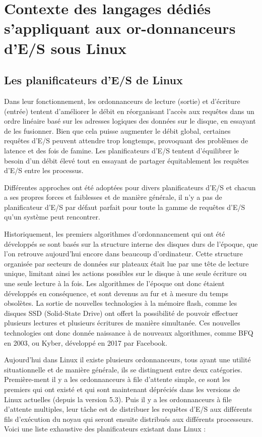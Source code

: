 \section[Contexte des langages dédiés s'appliquant aux ordonnanceurs d'E/S sous Linux]{Contexte des langages dédiés s'appliquant aux or-donnanceurs d'E/S sous Linux}
\label{context}

\subsection{Les planificateurs d'E/S de Linux}

Dans leur fonctionnement, les ordonnanceurs de lecture (sortie) et d'écriture 
(entrée) tentent d'améliorer le débit en réorganisant l'accès aux requêtes dans 
un ordre linéaire basé sur les adresses logiques des données sur le disque, en 
essayant de les fusionner. Bien que cela puisse augmenter le débit global, 
certaines requêtes d'E/S peuvent attendre trop longtemps, provoquant des 
problèmes de latence et des fois de famine. Les planificateurs d'E/S tentent 
d'équilibrer le besoin d'un débit élevé tout en essayant de partager 
équitablement les requêtes d'E/S entre les processus.

Différentes approches ont été adoptées pour divers planificateurs d'E/S et 
chacun a ses propres forces et faiblesses et de manière générale, il n'y a pas 
de planificateur d'E/S par défaut parfait pour toute la gamme de requêtes d'E/S 
qu'un système peut rencontrer. 

Historiquement, les premiers algorithmes d'ordonnancement qui ont été 
développés se sont basés sur la structure interne des disques durs de l'époque, 
que l'on retrouve aujourd'hui encore dans beaucoup d'ordinateur. Cette 
structure organisée par secteurs de données sur plateaux était lue par une tête 
de lecture unique, limitant ainsi les actions possibles sur le disque à une 
seule écriture ou une seule lecture à la fois. Les algorithmes de l'époque ont 
donc étaient développés en conséquence, et sont devenus au fur et à mesure du 
temps obsolètes. La sortie de nouvelles technologies à la mémoire flash, comme 
les disques SSD (Solid-State Drive) ont offert la possibilité de pouvoir 
effectuer plusieurs lectures et plusieurs écritures de manière simultanée. Ces 
nouvelles technologies ont donc donnée naissance à de nouveaux algorithmes, 
comme BFQ en 2003, ou Kyber, développé en 2017 par Facebook.

Aujourd'hui dans Linux il existe plusieurs ordonnanceurs, tous ayant une 
utilité situationnelle et de manière générale, ils se distinguent entre deux 
catégories. Première-ment il y a les ordonnanceurs à file d'attente simple, ce 
sont les premiers qui ont existé et qui sont maintenant dépréciés dans les 
versions de Linux actuelles (depuis la version 5.3). Puis il y a les 
ordonnanceurs à file d'attente multiples, leur tâche est de distribuer les 
requêtes d'E/S aux différents fils d'exécution du noyau qui seront ensuite 
distribués aux différents processeurs. Voici une liste exhaustive des 
planificateurs existant dans Linux :

